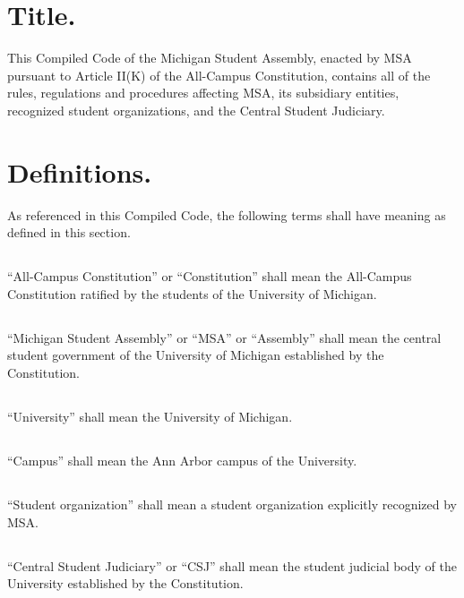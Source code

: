\article{}

\section{Title.}
This Compiled Code of the Michigan Student Assembly, enacted by MSA pursuant to Article II(K) of the All-Campus Constitution, contains all of the rules, regulations and procedures affecting MSA, its subsidiary entities, recognized student organizations, and the Central Student Judiciary.

\section{Definitions.}
As referenced in this Compiled Code, the following terms shall have meaning as defined in this section.

\subsection{}
``All-Campus Constitution'' or ``Constitution'' shall mean the All-Campus Constitution ratified by the students of the University of Michigan.

\subsection{}
``Michigan Student Assembly'' or ``MSA'' or ``Assembly'' shall mean the central student government of the University of Michigan established by the Constitution.

\subsection{}
``University'' shall mean the University of Michigan.

\subsection{}
``Campus'' shall mean the Ann Arbor campus of the University.

\subsection{}
``Student organization'' shall mean a student organization explicitly recognized by MSA.

\subsection{}
``Central Student Judiciary'' or ``CSJ'' shall mean the student judicial body of the University established by the Constitution.

